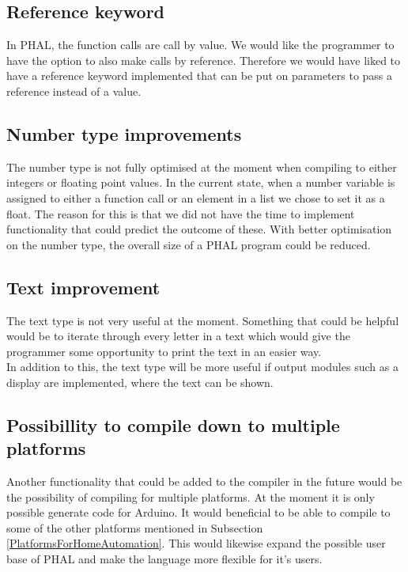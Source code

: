 \subsection*{Reference keyword}
In PHAL, the function calls are call by value. We would like the programmer to have the option to also make calls by reference. Therefore we would have liked to have a reference keyword implemented that can be put on parameters to pass a reference instead of a value.


\subsection*{Number type improvements}
The number type is not fully optimised at the moment when compiling to either integers or floating point values. 
In the current state, when a number variable is assigned to either a function call or an element in a list we chose to set it as a float. 
The reason for this is that we did not have the time to implement functionality that could predict the outcome of these.
With better optimisation on the number type, the overall size of a PHAL program could be reduced.

\subsection*{Text improvement}
The text type is not very useful at the moment. 
Something that could be helpful would be to iterate through every letter in a text which would give the programmer some opportunity to print the text in an easier way.\\
In addition to this, the text type will be more useful if output modules such as a display are implemented, where the text can be shown.

\subsection*{Possibillity to compile down to multiple platforms}
Another functionality that could be added to the compiler in the future would be the possibility of compiling for multiple platforms. 
At the moment it is only possible generate code for Arduino. 
It would beneficial to be able to compile to some of the other platforms mentioned in Subsection \ref{PlatformsForHomeAutomation}. 
This would likewise expand the possible user base of PHAL and make the language more flexible for it's users.